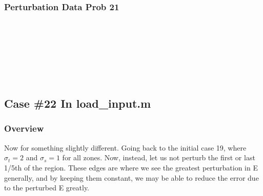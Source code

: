 \documentclass{article}
\begin{document}
\subsubsection{Perturbation Data Prob 21}
\\ \\
\\ \\
\\ \\

\subsection{Case \#22 In load\_input.m}
\subsubsection{Overview}
Now for something slightly different. Going back to the initial case 19, where $\sigma_t = 2$ and $\sigma_s=1$ for all zones. Now, instead, let us not perturb the first or last 1/5th of the region. These edges are where we see the greatest perturbation in E generally, and by keeping them constant, we may be able to reduce the error due to the perturbed E greatly. 
\end{document}
